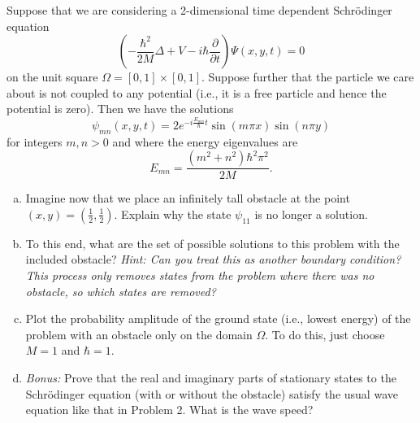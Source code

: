\documentclass[12pt]{amsbook}
\begin{document}
\newpage
\begin{problem}
Suppose that we are considering a 2-dimensional time dependent Schr\"odinger equation
\[
\left(-\frac{\hbar^2}{2M} \Delta + V - i \hbar \frac{\partial}{\partial t}\right) \Psi(x,y,t)=0
\] 
on the unit square $\Omega = [0,1]\times [0,1]$. Suppose further that the particle we care about is not coupled to any potential (i.e., it is a free particle and hence the potential is zero). Then we have the solutions
\[
\psi_{mn}(x,y,t) = 2 e^{-i\frac{E_{mn}}{\hbar}t} \sin(m \pi x) \sin(n \pi y)
\]
for integers $m,n>0$ and where the energy eigenvalues are
\[
E_{mn} = \frac{(m^2+n^2) \hbar^2 \pi^2}{2M}.
\]
\begin{enumerate}[(a)]
\vspace*{0.25cm}
    \item Imagine now that we place an infinitely tall obstacle at the point $(x,y)=\left(\frac{1}{2},\frac{1}{2} \right)$. Explain why the state $\psi_{11}$ is no longer a solution.
\vspace*{0.25cm}
    \item To this end, what are the set of possible solutions to this problem with the included obstacle? \emph{Hint: Can you treat this as another boundary condition? This process only removes states from the problem where there was no obstacle, so which states are removed?}
\vspace*{0.25cm}
    \item Plot the probability amplitude of the ground state (i.e., lowest energy) of the problem with an obstacle only on the domain $\Omega$. To do this, just choose $M=1$ and $\hbar=1$.
\vspace*{0.25cm}
	\item \emph{Bonus:} Prove that the real and imaginary parts of stationary states to the Schr\"odinger equation (with or without the obstacle) satisfy the usual wave equation like that in Problem 2. What is the wave speed?
\end{enumerate}
\end{problem}
\end{document}
